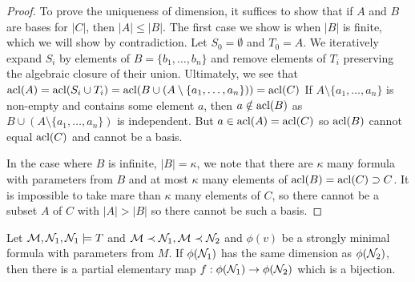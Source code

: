 \begin{proof}
To prove the uniqueness of dimension, it suffices to show that if \(A\) and \(B\) are bases for \(|C|\), then \(|A| \leq |B|\). 
The first case we show is when \(|B|\) is finite, which we will show by contradiction.  
Let \(S_0 = \emptyset\) and \(T_0 = A\). We iteratively expand \(S_i\) by elements of \(B = \{b_1, \ldots, b_n\}\) and remove elements of \(T_i\) preserving the algebraic closure of their union. 
Ultimately, we see that \(\text{acl}(A) = \text{acl}(S_i \cup T_i) = \text{acl}(B \cup (A \setminus \{a_1, \ldots, a_n\})) = \text{acl}(C)\)
If \(A \setminus \{a_1, \ldots, a_n\}\) is non-empty and contains some element \(a\), then \(a \notin \text{acl}(B)\) as \(B \cup (A \setminus \{a_1, \ldots, a_n\})\) is independent. 
But \(a \in \text{acl}(A) = \text{acl}(C)\) so \(\text{acl}(B)\) cannot equal \(\text{acl}(C)\) and cannot be a basis. 

In the case where \(B\) is infinite, \(|B| = \kappa\), we note that there are \(\kappa\) many formula with parameters from \(B\) and at most \(\kappa\) many elements of \(\text{acl}(B) = \text{acl}(C) \supset C\). 
It is impossible to take mare than \(\kappa\) many elements of \(C\), so there cannot be a subset \(A\) of \(C\) with \(|A| > |B|\) so there cannot be such a basis. 
\end{proof}

\begin{theorem}\label{partial_elementary_bijection}
Let \(\mathcal{M}, \mathcal{N}_1, \mathcal{N}_1 \models T\) and \(\mathcal{M} \prec \mathcal{N}_1, \mathcal{M} \prec \mathcal{N}_2\) and \(\phi(v)\) be a strongly minimal formula with parameters from \(M\).
If \(\phi(\mathcal{N}_1)\) has the same dimension as \(\phi(\mathcal{N}_2)\), then there is a partial elementary map \(f: \phi(\mathcal{N}_1) \to \phi(\mathcal{N}_2)\) which is a bijection. 
\end{theorem}

